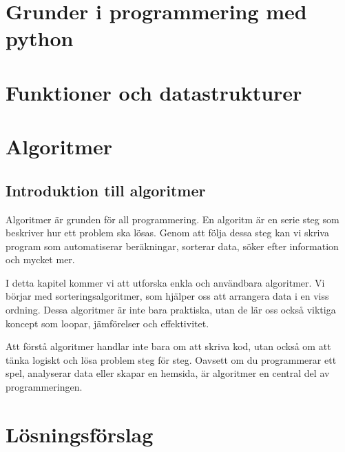 \maketitle
\tableofcontents

\newpage
\chapter{Grunder i programmering med python}
\label{chapter:1}

\newpage

\newpage

\newpage

\newpage

\newpage

\newpage

\newpage

\newpage



\chapter{Funktioner och datastrukturer}

\newpage

\newpage

\newpage

\newpage

\chapter{Algoritmer}
\label{chapter:2}
\section*{Introduktion till algoritmer}
Algoritmer är grunden för all programmering. En algoritm är en serie steg som beskriver hur ett problem ska lösas. Genom att följa dessa steg kan vi skriva program som automatiserar beräkningar, sorterar data, söker efter information och mycket mer.

I detta kapitel kommer vi att utforska enkla och användbara algoritmer. Vi börjar med sorteringsalgoritmer, som hjälper oss att arrangera data i en viss ordning. Dessa algoritmer är inte bara praktiska, utan de lär oss också viktiga koncept som loopar, jämförelser och effektivitet.

Att förstå algoritmer handlar inte bara om att skriva kod, utan också om att tänka logiskt och lösa problem steg för steg. Oavsett om du programmerar ett spel, analyserar data eller skapar en hemsida, är algoritmer en central del av programmeringen.


\newpage

\newpage

\newpage

\newpage
\chapter{Lösningsförslag}
\printsolutions[headings=false]
